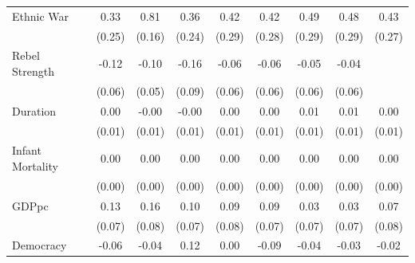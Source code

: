 \documentclass[12pt, letterpaper]{article}
\begin{document}
\begin{table}[htbp]
\begin{small}
\begin{tabular}{l*{8}{c}}
Ethnic War          &        0.33         &        0.81\sym{***}&        0.36\sym{+}  &        0.42\sym{+}  &        0.42\sym{+}  &        0.49\sym{+}  &        0.48\sym{+}  &        0.43\sym{+}  \\
                    &      (0.25)         &      (0.16)         &      (0.24)         &      (0.29)         &      (0.28)         &      (0.29)         &      (0.29)         &      (0.27)         \\
Rebel Strength      &       -0.12\sym{*}  &       -0.10\sym{*}  &       -0.16\sym{*}  &       -0.06         &       -0.06         &       -0.05         &       -0.04         &                     \\
                    &      (0.06)         &      (0.05)         &      (0.09)         &      (0.06)         &      (0.06)         &      (0.06)         &      (0.06)         &                     \\
Duration            &        0.00         &       -0.00         &       -0.00         &        0.00         &        0.00         &        0.01         &        0.01         &        0.00         \\
                    &      (0.01)         &      (0.01)         &      (0.01)         &      (0.01)         &      (0.01)         &      (0.01)         &      (0.01)         &      (0.01)         \\
Infant Mortality    &        0.00         &        0.00\sym{+}  &        0.00         &        0.00         &        0.00         &        0.00         &        0.00         &        0.00         \\
                    &      (0.00)         &      (0.00)         &      (0.00)         &      (0.00)         &      (0.00)         &      (0.00)         &      (0.00)         &      (0.00)         \\
GDPpc               &        0.13\sym{*}  &        0.16\sym{*}  &        0.10         &        0.09         &        0.09         &        0.03         &        0.03         &        0.07         \\
                    &      (0.07)         &      (0.08)         &      (0.07)         &      (0.08)         &      (0.07)         &      (0.07)         &      (0.07)         &      (0.08)         \\
Democracy           &       -0.06         &       -0.04         &        0.12         &        0.00         &       -0.09         &       -0.04         &       -0.03         &       -0.02         \\

\end{tabular}
\end{small}
\end{table}
\end{document}
